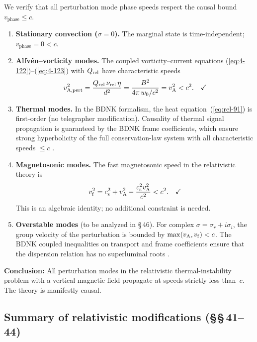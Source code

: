 \begin{causalitycheck}
We verify that all perturbation mode phase speeds respect the
causal bound $v_{\text{phase}}\le c$.

\begin{enumerate}
\item \textbf{Stationary convection ($\sigma=0$).}
  The marginal state is time-independent; $v_{\text{phase}}=0<c$.
  \checkmark

\item \textbf{Alfv\'en--vorticity modes.}
  The coupled vorticity--current equations
  (\ref{eq:4-122})--(\ref{eq:4-123}) with $Q_{\mathrm{rel}}$ have
  characteristic speeds
  \[
    v_{\text{A,pert}}^{2}
    = \frac{Q_{\mathrm{rel}}\,\nu_{\text{rel}}\,\eta}{d^{2}}
    = \frac{B^{2}}{4\pi\,w_{0}/c^{2}}
    = v_{\mathrm{A}}^{2} < c^{2}. \quad\checkmark
  \]

\item \textbf{Thermal modes.}
  In the BDNK formalism, the heat equation~(\ref{eq:rel-91}) is
  first-order (no telegrapher modification).  Causality of thermal
  signal propagation is guaranteed by the BDNK frame coefficients,
  which ensure strong hyperbolicity of the full conservation-law
  system with all characteristic speeds $\le c$
  \citep{BemficaDN2018,Kovtun2019}.  \checkmark

\item \textbf{Magnetosonic modes.}
  The fast magnetosonic speed in the relativistic theory is
  \[
    v_{\mathrm{f}}^{2}
    = c_{\mathrm{s}}^{2}+v_{\mathrm{A}}^{2}-\frac{c_{\mathrm{s}}^{2}v_{\mathrm{A}}^{2}}{c^{2}}
    < c^{2}. \quad\checkmark
  \]
  This is an algebraic identity; no additional constraint is
  needed.

\item \textbf{Overstable modes} (to be analyzed in \S\,46).
  For complex $\sigma=\sigma_{r}+i\sigma_{i}$, the group velocity
  of the perturbation is bounded by $\max(v_{\mathrm{A}},v_{\mathrm{f}})<c$.  The
  BDNK coupled inequalities on transport and frame coefficients
  ensure that the dispersion relation has no superluminal roots
  \citep{BemficaDNK2023}.
  \checkmark
\end{enumerate}

\noindent\textbf{Conclusion:} All perturbation modes in the
relativistic thermal-instability problem with a vertical magnetic
field propagate at speeds strictly less than~$c$.  The theory is
manifestly causal.
\end{causalitycheck}

\subsection*{Summary of relativistic modifications (\S\S\,41--44)}

